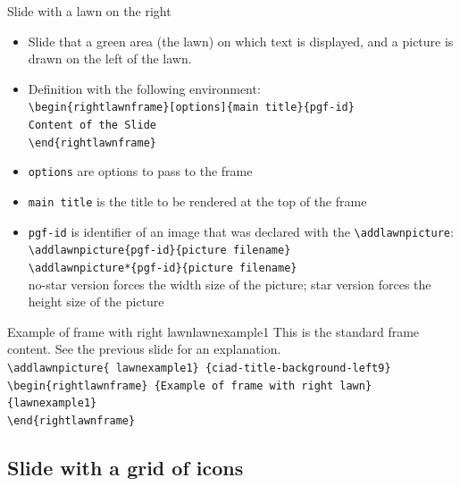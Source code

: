 \documentclass[english,sectioncirclenumberstyle]{ciadbeamer}
\begin{document}
\begin{frame}{Slide with a lawn on the right}
	\begin{itemize}
		\item Slide that a green area (the lawn) on which text is displayed, and a picture is drawn on the left of the lawn.
		\item Definition with the following environment: \\
			\texttt{{\textbackslash}begin\{rightlawnframe\}[options]\{main title\}\{pgf-id\}} \\
			\texttt{Content of the Slide} \\
			\texttt{{\textbackslash}end\{rightlawnframe\}}
		\item \texttt{options} are options to pass to the frame
		\item \texttt{main title} is the title to be rendered at the top of the frame
		\item \texttt{pgf-id} is identifier of an image that was declared with the \texttt{{\textbackslash}addlawnpicture}: \\
		\texttt{{\textbackslash}addlawnpicture\{pgf-id\}\{picture filename\}} \\
		\texttt{{\textbackslash}addlawnpicture*\{pgf-id\}\{picture filename\}} \\
		no-star version forces the width size of the picture; star version forces the height size of the picture
	\end{itemize}
\end{frame}

\begin{rightlawnframe}{{Example of frame} with right lawn}{lawnexample1}
	This is the standard frame content. See the previous slide for an explanation. \\[.5cm]
	\smaller
	\texttt{{\textbackslash}addlawnpicture\{ lawnexample1\} \{ciad-title-background-left9\}} \\
	\texttt{{\textbackslash}begin\{rightlawnframe\} \{Example of frame with right lawn\}\{lawnexample1\}} \\
	\texttt{{\textbackslash}end\{rightlawnframe\}}
\end{rightlawnframe}

\subsection{Slide with a grid of icons}
\subsectiontableofcontentslide
\end{document}
